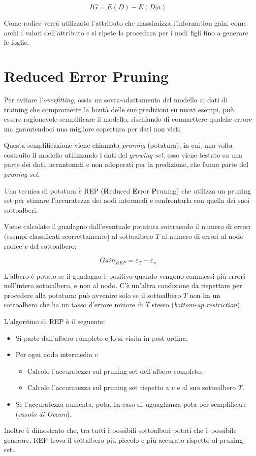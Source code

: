$$ IG = E(D) - E(D|a) $$

Come radice verrà utilizzato l'attributo che massimizza l'information gain, come archi i valori dell'attributo e si ripete la procedura per i nodi figli fino a generare le foglie.

\section{Reduced Error Pruning}
\label{ss:rep}
Per evitare l'\textit{overfitting}, ossia un sovra-adattamento del modello ai dati di training che compromette la bontà delle sue predizioni su nuovi esempi, può essere ragionevole semplificare il modello, rischiando di commettere qualche errore ma garantendoci una migliore copertura per dati non visti.

Questa semplificazione viene chiamata \textit{pruning} (potatura), in cui, una volta costruito il modello utilizzando i dati del \textit{growing set}, esso viene testato su una parte dei dati, accantonati e non adoperati per la predizione, che fanno parte del \textit{pruning set}.

Una tecnica di potatura è REP (\textbf{R}educed \textbf{E}rror \textbf{P}runing)\cite{Quinlan:1987:SDT:50007.50008} che utilizza un pruning set per stimare l'accuratezza dei nodi intermedi e confrontarla con quella dei suoi sottoalberi.

Viene calcolato il guadagno dall'eventuale potatura sottraendo il numero di errori (esempi classificati scorrettamente) al sottoalbero $T$ al numero di errori al nodo radice $v$ del sottoalbero:

$$ Gain_{REP} = \varepsilon_T - \varepsilon_v $$

L'albero è potato se il guadagno è positivo quando vengono commessi più errori nell'intero sottoalbero, e non al nodo. C'è un'altra condizione da rispettare per procedere alla potatura: può avvenire solo se il sottoalbero $T$ non ha un sottoalbero che ha un tasso d'errore minore di $T$ stesso (\textit{bottom-up restriction}).

L'algoritmo di REP è il seguente:
\begin{itemize}
	\item Si parte dall'albero completo e lo si visita in post-ordine.
	\item Per ogni nodo intermedio $v$
	      \begin{itemize}
	      	\item Calcolo l'accuratezza sul pruning set dell'albero completo.
	      	\item Calcolo l'accuratezza sul pruning set rispetto a $v$ e al suo sottoalbero $T$.
	      \end{itemize}
	\item Se l'accuratezza aumenta, pota. In caso di uguaglianza pota per semplificare (\emph{rasoio di Occam}).
\end{itemize}

Inoltre è dimostrato che, tra tutti i possibili sottoalberi potati che è possibile generare, REP trova il sottalbero più piccolo e più accurato rispetto al pruning set\cite{Esposito:1997:CAM:252862.252878}.
